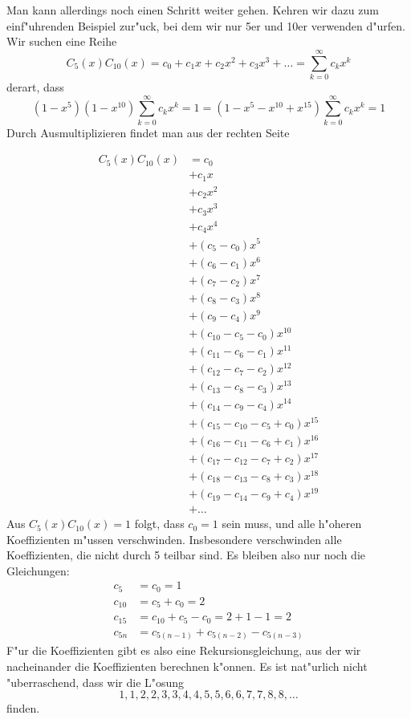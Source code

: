 Man kann allerdings noch einen Schritt weiter gehen.
Kehren wir dazu zum
einf"uhrenden Beispiel zur"uck, bei dem wir nur 5er und 10er verwenden
d"urfen.
Wir suchen eine Reihe
\[
C_5(x)C_{10}(x)=c_0+c_1x+c_2x^2+c_3x^3+\dots=\sum_{k=0}^\infty c_kx^k
\]
derart, dass
\[
(1-x^5)(1-x^{10}) \sum_{k=0}^\infty c_kx^k=1
=
(1-x^5-x^{10}+x^{15}) \sum_{k=0}^\infty c_kx^k=1
\]
Durch Ausmultiplizieren findet man aus der rechten Seite

{\allowdisplaybreaks
\begin{align*}
C_5(x)C_{10}(x)&=c_0\\
&+c_1x\\
&+c_2x^2\\
&+c_3x^3\\
&+c_4x^4\\
&+(c_5-c_0)x^5\\
&+(c_6-c_1)x^6\\
&+(c_7-c_2)x^7\\
&+(c_8-c_3)x^8\\
&+(c_9-c_4)x^9\\
&+(c_{10} - c_5 -c_0)x^{10}\\
&+(c_{11} - c_6 -c_1)x^{11}\\
&+(c_{12} - c_7 -c_2)x^{12}\\
&+(c_{13} - c_8 -c_3)x^{13}\\
&+(c_{14} - c_9 -c_4)x^{14}\\
&+(c_{15} - c_{10} - c_{5} +c_0)x^{15}\\
&+(c_{16} - c_{11} - c_{6} +c_1)x^{16}\\
&+(c_{17} - c_{12} - c_{7} +c_2)x^{17}\\
&+(c_{18} - c_{13} - c_{8} +c_3)x^{18}\\
&+(c_{19} - c_{14} - c_{9} +c_4)x^{19}\\
&+\dots
\end{align*}
}
Aus $C_{5}(x)C_{10}(x)=1$ folgt, dass $c_0=1$ sein muss, und alle
h"oheren Koeffizienten m"ussen verschwinden.
Insbesondere verschwinden
alle Koeffizienten, die nicht durch 5 teilbar sind.
Es bleiben also nur noch
die Gleichungen:
\begin{align*}
c_5&=c_0=1\\
c_{10}&=c_5+c_0=2\\
c_{15}&=c_{10}+c_{5}-c_0=2 + 1 - 1=2\\
c_{5n}&=c_{5(n-1)}+c_{5(n-2)}-c_{5(n-3)}
\end{align*}
F"ur die Koeffizienten gibt es also eine Rekursionsgleichung, aus der wir
nacheinander die Koeffizienten berechnen k"onnen.
Es ist nat"urlich nicht
"uberraschend, dass wir die L"osung
\[
1, 1, 2, 2, 3, 3, 4, 4, 5, 5, 6, 6, 7, 7, 8, 8, \dots
\]
finden.

